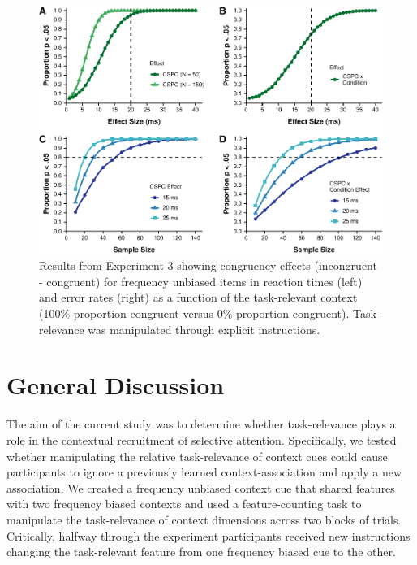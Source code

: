 \documentclass[english,,man,floatsintext]{apa6}
\begin{document}
\begin{figure}
\centering
\includegraphics{manuscript_pretty_files/figure-latex/figure5-1.pdf}
\caption{\label{fig:figure5}Results from Experiment 3 showing congruency effects (incongruent - congruent) for frequency unbiased items in reaction times (left) and error rates (right) as a function of the task-relevant context (100\% proportion congruent versus 0\% proportion congruent). Task-relevance was manipulated through explicit instructions.}
\end{figure}



\hypertarget{general-discussion}{%
\section{General Discussion}\label{general-discussion}}

The aim of the current study was to determine whether task-relevance plays a role in the contextual recruitment of selective attention. Specifically, we tested whether manipulating the relative task-relevance of context cues could cause participants to ignore a previously learned context-association and apply a new association. We created a frequency unbiased context cue that shared features with two frequency biased contexts and used a feature-counting task to manipulate the task-relevance of context dimensions across two blocks of trials. Critically, halfway through the experiment participants received new instructions changing the task-relevant feature from one frequency biased cue to the other.
\end{document}
